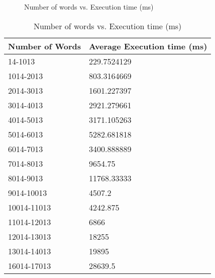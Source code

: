 \begin{figure}\centering
	\caption{Number of words vs. Execution time (ms)}\label{fig:wordsTime}
\end{figure}

\begin{table}\centering
	\caption{Number of words vs. Execution time (ms)}\label{tab:wordsTime}
   	\begin{tabular}{ | p{4cm\textwidth} | p{4cm\textwidth} |}
   	\hline

\textbf{Number of Words}  & \textbf{Average Execution time (ms)}       \\\hline
14-1013     & 229.7524129 \\\hline
1014-2013   & 803.3164669 \\\hline
2014-3013   & 1601.227397 \\\hline
3014-4013   & 2921.279661 \\\hline
4014-5013   & 3171.105263 \\\hline
5014-6013   & 5282.681818 \\\hline
6014-7013   & 3400.888889 \\\hline
7014-8013   & 9654.75     \\\hline
8014-9013   & 11768.33333 \\\hline
9014-10013  & 4507.2      \\\hline
10014-11013 & 4242.875    \\\hline
11014-12013 & 6866        \\\hline
12014-13013 & 18255       \\\hline
13014-14013 & 19895       \\\hline
16014-17013 & 28639.5    \\\hline

    \end{tabular}
\end{table}

